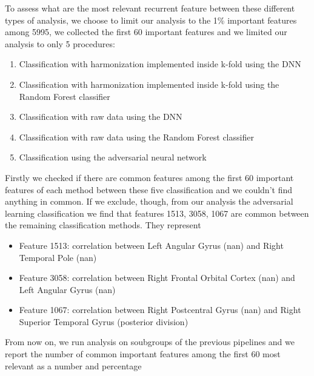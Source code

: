 \documentclass[12pt]{report}
\begin{document}
To assess what are the most relevant recurrent feature between these different types of analysis, we choose to limit our analysis to the 1\% important features among 5995, we collected the first 60 important features and we limited our analysis to only 5 procedures:
\begin{enumerate}
\item Classification with harmonization implemented inside k-fold using the DNN \label{proc:dnn_kfold}
\item Classification with harmonization implemented inside k-fold using the Random Forest classifier \label{proc:rf_kfold}
\item Classification with raw data using the DNN \label{proc:dnn_no}
\item Classification with raw data using the Random Forest classifier \label{proc:rf_no}
\item Classification using the adversarial neural network \label{proc:adv}
\end{enumerate}

Firstly we checked if there are common features among the first 60 important features of each method between these five classification and we couldn't find anything in common.
If we exclude, though, from our analysis the adversarial learning classification we find that features 1513, 3058, 1067 are common between the remaining classification methods.
They represent
\begin{itemize}
\item Feature 1513: correlation between Left Angular Gyrus (nan) and Right Temporal Pole (nan)
\item Feature 3058: correlation between Right Frontal Orbital Cortex (nan) and Left Angular Gyrus (nan)
\item Feature 1067: correlation between Right Postcentral Gyrus (nan) and Right Superior Temporal Gyrus (posterior division)
\end{itemize}

From now on, we run analysis on soubgroups of the previous pipelines and we report the number of common important features among the first 60 most relevant as a number and percentage
\end{document}
